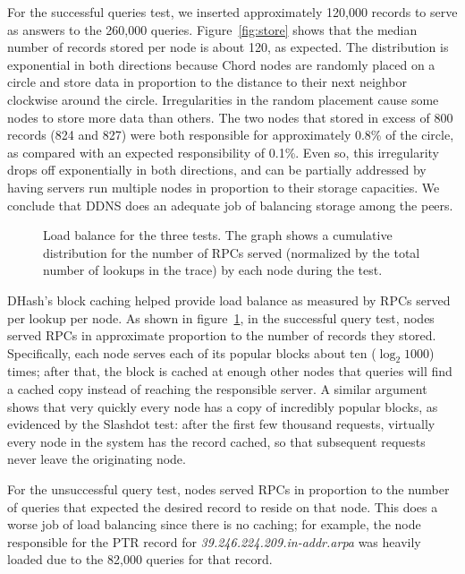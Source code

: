 For the successful queries test, we inserted approximately 120,000
records to serve as answers to the 260,000 queries.
Figure~\ref{fig:store} shows that the median number of
records stored per node is about 120, as expected.
The distribution is exponential in both directions because
Chord nodes are randomly placed on a circle and store data
in proportion to the distance to their next neighbor clockwise
around the circle.  Irregularities in the random placement cause
some nodes to store more data than others.
The two nodes that stored in excess of 800
records (824 and 827) were both responsible for approximately
0.8\% of the circle, as compared with an expected 
responsibility of 0.1\%.
Even so, this irregularity drops off exponentially in both
directions, and can be partially addressed by having servers
run multiple nodes in proportion to their storage capacities.
We conclude that DDNS does an adequate job of balancing
storage among the peers.

\begin{figure}
\caption{Load balance for the three tests.
The graph shows a cumulative distribution for the number
of RPCs served (normalized by the total number of lookups in the trace)
 by each node during the test.}
\label{fig:both-rpc}
\end{figure}

DHash's block caching helped provide load balance as
measured by RPCs served per lookup per node.
As shown in figure~\ref{fig:both-rpc},
in the successful query test, nodes served RPCs in
approximate proportion to the number of records they stored.
Specifically, each node serves each of its popular blocks about
ten ($\log_2 1000$) times; after that, the block is cached
at enough other nodes that queries will find a cached copy
instead of reaching the responsible server.
A similar argument shows that very quickly every node has
a copy of incredibly popular blocks, as evidenced by the
Slashdot test: after the first few thousand requests, virtually
every node in the system has the record cached, so that
subsequent requests never leave the originating node.

For the unsuccessful query test, nodes served RPCs in 
proportion to the number of queries that expected the
desired record to reside on that node.
This does a worse job of load balancing since there is
no caching; for example, the node responsible for the
PTR record for {\em 39.246.224.209.in-addr.arpa} was
heavily loaded due to the 82,000 queries for that record.

